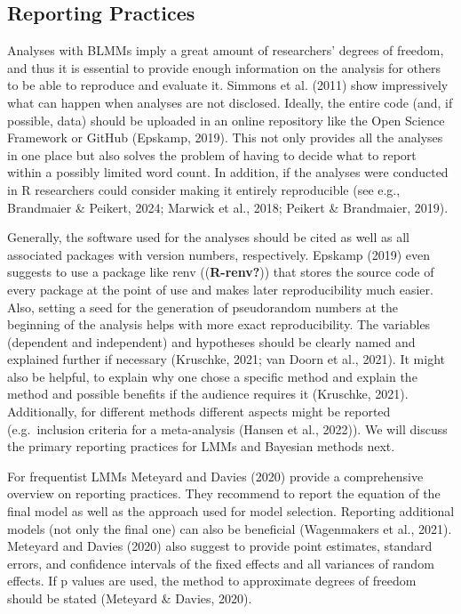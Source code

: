 \documentclass[
  doc,12pt,floatsintext]{apa7}
\begin{document}
\subsection{Reporting Practices}\label{reporting-practices}

Analyses with BLMMs imply a great amount of researchers' degrees of freedom, and thus it is essential to provide enough information on the analysis for others to be able to reproduce and evaluate it. Simmons et al. (2011) show impressively what can happen when analyses are not disclosed. Ideally, the entire code (and, if possible, data) should be uploaded in an online repository like the Open Science Framework or GitHub (Epskamp, 2019). This not only provides all the analyses in one place but also solves the problem of having to decide what to report within a possibly limited word count. In addition, if the analyses were conducted in R researchers could consider making it entirely reproducible (see e.g., Brandmaier \& Peikert, 2024; Marwick et al., 2018; Peikert \& Brandmaier, 2019).

Generally, the software used for the analyses should be cited as well as all associated packages with version numbers, respectively. Epskamp (2019) even suggests to use a package like renv ((\textbf{R-renv?})) that stores the source code of every package at the point of use and makes later reproducibility much easier. Also, setting a seed for the generation of pseudorandom numbers at the beginning of the analysis helps with more exact reproducibility. The variables (dependent and independent) and hypotheses should be clearly named and explained further if necessary (Kruschke, 2021; van Doorn et al., 2021). It might also be helpful, to explain why one chose a specific method and explain the method and possible benefits if the audience requires it (Kruschke, 2021). Additionally, for different methods different aspects might be reported (e.g.~inclusion criteria for a meta-analysis (Hansen et al., 2022)). We will discuss the primary reporting practices for LMMs and Bayesian methods next.

For frequentist LMMs Meteyard and Davies (2020) provide a comprehensive overview on reporting practices. They recommend to report the equation of the final model as well as the approach used for model selection. Reporting additional models (not only the final one) can also be beneficial (Wagenmakers et al., 2021). Meteyard and Davies (2020) also suggest to provide point estimates, standard errors, and confidence intervals of the fixed effects and all variances of random effects. If p values are used, the method to approximate degrees of freedom should be stated (Meteyard \& Davies, 2020).
\end{document}
